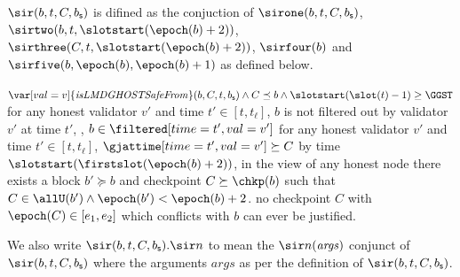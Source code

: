 \documentclass{article}
\begin{document}
\begin{definition}\label{def:induction-conditions}
    $\sir(b,t,C,b_\mathsf{s})$ is difined as the conjuction of $\sirone(b,t,C,b_\mathsf{s})$, $\sirtwo(b,t,\slotstart(\epoch(b)+2))$, $\sirthree(C,t,\slotstart(\epoch(b)+2))$, $\sirfour(b)$ and $\sirfive(b, \epoch(b),\epoch(b)+1)$ as defined below.
    \begin{enumerate}[label=SIR.\arabic*.,leftmargin=20ex,ref=SIR.\arabic*]
        \label{def:induction-conditions:is-lmd-confirmed}  $\var[val=v]{\mathit{isLMDGHOSTSafeFrom}}(b,C,t,b_\mathsf{s})  \land C \preceq b  \land \slotstart(\slot(t)-1)\geq \GGST$
            \label{def:induction-conditions:all-validators:not-filtered-out} for any honest validator $v'$ and time $t' \in [t,t_\ell]$, $b$ is not filtered out by validator $v'$ at time $t'$, \ie, $b \in \filtered[time=t',val=v']$
            \label{def:induction-conditions:all-validators:gj-succ} for any honest validator $v'$ and time $t' \in [t,t_\ell]$, $\gjattime[time=t',val=v']\succeq C$
        \label{def:induction-conditions:ub} by time $\slotstart(\firstslot(\epoch(b)+2))$, in the view of any honest node there exists a block $b' \succeq b$ and checkpoint $C \succeq \chkp(b)$ such that $C \in \allU(b') \land \epoch(b') < \epoch(b)+2$.
        \label{def:induction-conditions:no-conflicting} no checkpoint $C$ with $\epoch(C) \in [e_1,e_2]$ which conflicts with $b$ can ever be justified.
    \end{enumerate}
    We also write $\sir(b,t,C,b_\mathsf{s}).\sir n$ to mean the $\sir n(\mathit{args})$ conjunct of $\sir(b,t,C,b_\mathsf{s})$ where the arguments $\mathit{args}$ as per the definition of $\sir(b,t,C,b_\mathsf{s})$.


\end{definition}
\end{document}
